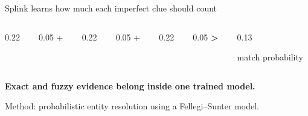 \documentclass[aspectratio=169,12pt]{beamer}
\begin{document}
\begin{frame}{Splink learns how much each imperfect clue should count}
  \vspace{0.18cm}
  \begin{columns}[c,onlytextwidth]
    \begin{column}{0.22\textwidth}
    \end{column}
    \begin{column}{0.05\textwidth}
      \centering\fontsize{24}{24}\selectfont\color{Slate}+
    \end{column}
    \begin{column}{0.22\textwidth}
    \end{column}
    \begin{column}{0.05\textwidth}
      \centering\fontsize{24}{24}\selectfont\color{Slate}+
    \end{column}
    \begin{column}{0.22\textwidth}
    \end{column}
    \begin{column}{0.05\textwidth}
      \centering\fontsize{24}{24}\selectfont\bfseries\color{Slate}>
    \end{column}
    \begin{column}{0.13\textwidth}
      \centering
      \par
      {\fontsize{11}{13}\selectfont match probability}
    \end{column}
  \end{columns}

  \vspace{0.65cm}
  \centering
  {\fontsize{16}{20}\selectfont\bfseries Exact and fuzzy evidence belong inside one trained model.}\par
  {\fontsize{12}{16}\selectfont\color{Slate}Method: probabilistic entity resolution using a Fellegi--Sunter model.}
\end{frame}
\end{document}

